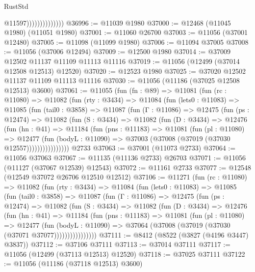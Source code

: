 \begin{lexlean}{RustStd}
\begin{coremodule}
                                @11597))))))))))))))
@36996 := @11039 @1980
@37000 := @12468 (@11045 @1980) (@11051 @1980)
@37001 := @11060 @26700
@37003 := @11056 (@37001 @12480)
@37005 := @11098 (@11099 @1980)
@37006 := @11094 @37005
@37008 := @11056 (@37006 @12494)
@37009 := @12500 @1980
@37014 := @37009 @12502 @11137 @11109 @11113 @11116
@37019 := @11056 (@12499 (@37014 @12508 @12513) @12520)
@37020 := @12523 @1980
@37025 := @37020 @12502 @11137 @11109 @11113 @11116
@37030 := @11056 (@11186 (@37025 @12508 @12513) @3600)
@37061 := @11055
    (fun (fn : @89) =>
    @11081
      (fun (rc : @11080) =>
      @11082
        (fun (rty : @3434) =>
        @11084
          (fun (lets0 : @11083) =>
          @11085
            (fun (tail0 : @3858) =>
            @11087
              (fun (Γ : @11086) =>
              @12475
                (fun (ps : @12474) =>
                @11082
                  (fun (S : @3434) =>
                  @11082
                    (fun (D : @3434) =>
                    @12476
                      (fun (hn : @41) =>
                      @11184
                        (fun (pns : @11183) =>
                        @11081
                          (fun (pl : @11080) =>
                          @12477
                            (fun (bodyL : @11090) =>
                            @37003 (@37008 (@37019 (@37030 @12557))))))))))))))))
    @2733
@37063 := @37001 (@11073 @2733)
@37064 := @11056 @37063
@37067 := @11135 (@11136 @2733) @26703
@37071 := @11056 (@11127 (@37067 @12539) @12543)
@37072 := @11161 @2733
@37077 := @12548 (@12549 @37072 @26706 @12510 @12512)
@37106 := @11271
    (fun (rc : @11080) =>
    @11082
      (fun (rty : @3434) =>
      @11084
        (fun (lets0 : @11083) =>
        @11085
          (fun (tail0 : @3858) =>
          @11087
            (fun (Γ : @11086) =>
            @12475
              (fun (ps : @12474) =>
              @11082
                (fun (S : @3434) =>
                @11082
                  (fun (D : @3434) =>
                  @12476
                    (fun (hn : @41) =>
                    @11184
                      (fun (pns : @11183) =>
                      @11081
                        (fun (pl : @11080) =>
                        @12477
                          (fun (bodyL : @11090) =>
                          @37064 (@37008 (@37019 (@37030 (@37071 @37077))))))))))))))))
@37111 := @8412 (@8522 (@3827 (@4196 @3447) @3837))
@37112 := @37106 @37111
@37113 := @37014 @37111
@37117 := @11056 (@12499 (@37113 @12513) @12520)
@37118 := @37025 @37111
@37122 := @11056 (@11186 (@37118 @12513) @3600)

\end{coremodule}
\end{lexlean}
